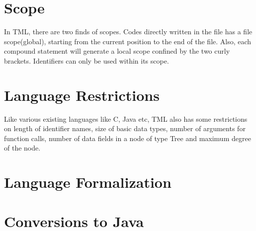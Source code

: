 \documentclass[12pt,psfig,a4]{article}
\begin{document}
\section{Scope}
In TML, there are two finds of scopes. Codes directly written in the file has a file scope(global), starting from the current position to the end of the file. Also, each compound statement will generate a local scope confined by the two curly brackets. Identifiers can only be used within its scope.

\section{Language Restrictions}
Like various existing languages like C, Java etc, TML also has some restrictions on length of identifier names, size of basic data types, number of arguments for function calls, number of data fields in a node of type Tree and maximum degree of the node.

\section{Language Formalization}

\section{Conversions to Java}






\end{document}
